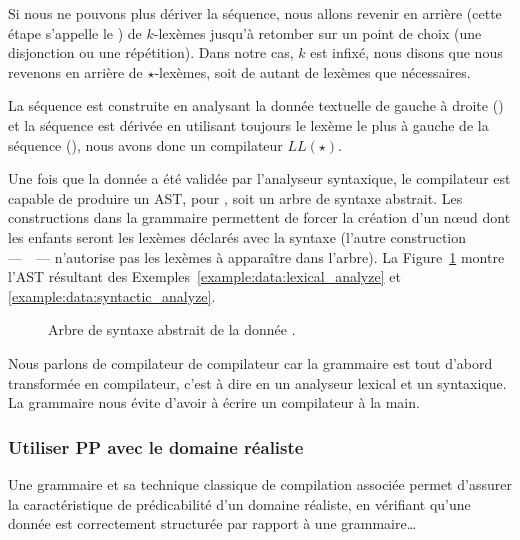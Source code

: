 Si nous ne pouvons plus dériver la séquence, nous allons revenir en arrière
(cette étape s'appelle le ) de $k$-lexèmes jusqu'à
retomber sur un point de choix (une disjonction ou une répétition). Dans notre
cas, $k$ est infixé, nous disons que nous revenons en arrière de
$\star$-lexèmes, soit de autant de lexèmes que nécessaires.

La séquence est construite en analysant la donnée textuelle de gauche à droite
() et la séquence est dérivée en utilisant
toujours le lexème le plus à gauche de la séquence (), nous avons donc un compilateur $LL(\star)$.

Une fois que la donnée a été validée par l'analyseur syntaxique, le compilateur
est capable de produire un AST, pour , soit un
arbre de syntaxe abstrait. Les constructions  dans la grammaire
permettent de forcer la création d'un nœud dont les enfants seront les lexèmes
déclarés avec la syntaxe  (l'autre construction
—~~— n'autorise pas les lexèmes à apparaître dans l'arbre). La
Figure~\ref{figure:data:ast} montre l'AST résultant des
Exemples~\ref{example:data:lexical_analyze} et
\ref{example:data:syntactic_analyze}. \\

\begin{figure}


\caption{\label{figure:data:ast} Arbre de syntaxe abstrait de la donnée .}

\end{figure}

Nous parlons de {\strong compilateur de compilateur} car la grammaire est tout
d'abord transformée en compilateur, c'est à dire en un analyseur lexical et un
syntaxique. La grammaire nous évite d'avoir à écrire un compilateur à la main.

\subsubsection{Utiliser PP avec le domaine réaliste }

Une grammaire et sa technique classique de compilation associée permet d'assurer
la caractéristique de prédicabilité d'un domaine réaliste, en vérifiant qu'une
donnée est correctement structurée par rapport à une grammaire…

